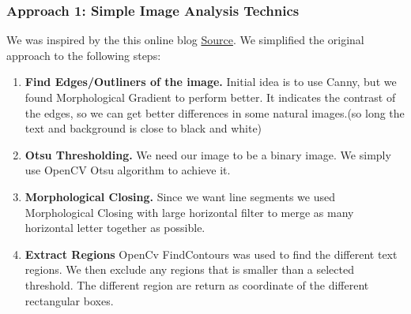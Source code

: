 \documentclass[11pt,a4paper,UKenglish]{report}
\begin{document}
\begin{flushleft}
  \subsubsection{Approach 1: Simple Image Analysis Technics}
  We was inspired by the this online blog \href{https://www.danvk.org/2015/01/07/finding-blocks-of-text-in-an-image-using-python-opencv-and-numpy.html}{Source}\cite{_finding_????}. We simplified the original approach to the following steps:
  \begin{enumerate}
    \item \textbf{Find Edges/Outliners of the image.}
    Initial idea is to use Canny, but we found Morphological Gradient to perform better. It indicates the contrast of the edges, so we can get better differences in some natural images.(so long the text and background is close to black and white)
    \item \textbf{Otsu Thresholding.}
    We need our image to be a binary image. We simply use OpenCV Otsu algorithm to achieve it.
    \item \textbf{Morphological Closing.}
    Since we want line segments we used Morphological Closing with large horizontal filter to merge as many horizontal letter together as possible.
    \item \textbf{Extract Regions}
    OpenCv FindContours was used to find the different text regions. We then exclude any regions that is smaller than a selected threshold. The different region are return as coordinate of the different rectangular boxes.
  \end{enumerate}
\end{flushleft}
\end{document}
